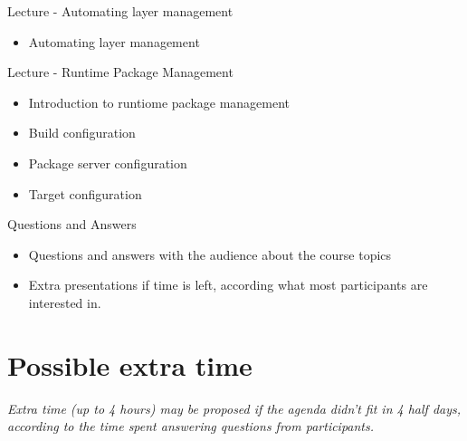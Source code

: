 \documentclass[a4paper,12pt,obeyspaces,spaces,hyphens]{article}
\begin{document}
\feagendatwocolumn
{Lecture - Automating layer management}
{
  \begin{itemize}
  \item Automating layer management
  \end{itemize}
}
{Lecture - Runtime Package Management}
{
  \begin{itemize}
  \item Introduction to runtiome package management
  \item Build configuration
  \item Package server configuration
  \item Target configuration
  \end{itemize}
}

\feagendaonecolumn
{Questions and Answers}
{
  \begin{itemize}
  \item Questions and answers with the audience about the course topics
  \item Extra presentations if time is left, according what most
        participants are interested in.
  \end{itemize}
}

\section{Possible extra time}

{\em Extra time (up to 4 hours) may be proposed if the agenda didn't fit in 4 half days,
     according to the time spent answering questions from participants.}
\end{document}
